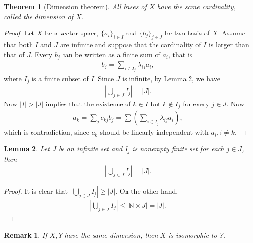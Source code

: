 \documentclass[10pt]{book}
\newtheorem{theorem}{Theorem}[chapter]
\newtheorem{lemma}[theorem]{Lemma}
\newtheorem{remark}{Remark}[chapter]
\theoremstyle{definition}
\numberwithin{equation}{chapter}
\begin{document}
\begin{theorem}[Dimension theorem]
All bases of $X$ have the same cardinality, called the dimension of $X$.
\end{theorem}
\begin{proof}
Let $X$ be a vector space, $\{a_i\}_{i \in I}$ and $\{b_j\}_{j \in J}$ be two basis of $X$. Assume that both $I$ and $J$ are infinite and suppose that the cardinality of $I$ is larger than that of $J$. Every $b_j$ can be written as a finite sum of $a_i$, that is
\begin{align*}
    b_j = \sum_{i \in I_j} \lambda_{ij} a_i,
\end{align*}
where $I_j$ is a finite subset of $I$. Since $J$ is infinite, by Lemma \ref{lemma_159}, we have
\begin{align*}
    \left|\bigcup_{j \in J} I_j\right| = \left|J\right|.
\end{align*}
Now $\left|I\right| > \left|J\right|$ implies that the existence of $k \in I$ but $k \notin I_j$ for every $j \in J$. Now 
\begin{align*}
    a_k = \sum_j c_{kj} b_j = \sum \left(\sum_{i \in I_j} \lambda_{ij} a_i\right),
\end{align*}
which is contradiction, since $a_k$ should be linearly independent with $a_i, i \neq k$.
\end{proof}

\medskip

\begin{lemma}\label{lemma_159}
Let $J$ be an infinite set and $I_j$ is nonempty finite set for each $j \in J$, then 
\begin{align*}
    \left|\bigcup_{j \in J} I_j\right| = \left|J\right|.
\end{align*}
\end{lemma}
\begin{proof}
It is clear that $\left|\bigcup_{j \in J} I_j\right| \geq \left|J\right|$. On the other hand, \begin{align*}
    \left|\bigcup_{j \in J} I_j\right| \leq \left|\mathbb{N} \times J\right| = \left|J\right|.
\end{align*}
\end{proof}

\begin{remark}
If $X, Y$ have the same dimension, then $X$ is isomorphic to $Y$.
\end{remark}

\medskip
\end{document}
